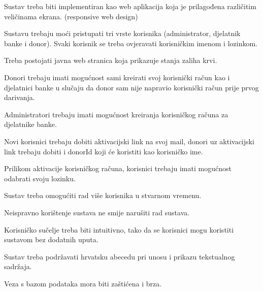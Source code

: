\begin{packed_item}
	
	\item Sustav treba biti implementiran kao web aplikacija koja je prilagođena različitim veličinama ekrana. (responsive web design)
	\item Sustavu trebaju moći pristupati tri vrste korisnika (administrator, djelatnik banke i donor). Svaki korisnik se treba ovjeravati korisničkim imenom i lozinkom.
	\item Treba postojati javna web stranica koja prikazuje stanja zaliha krvi.
	\item Donori trebaju imati mogućnost sami kreirati svoj korisnički račun kao i djelatnici banke u slučaju da donor sam nije napravio korisnički račun prije prvog darivanja.
	\item Administratori trebaju imati mogućnost kreiranja korisničkog računa za djelatnike banke.
	\item Novi korisnici trebaju dobiti aktivacijski link na svoj mail, donori uz aktivacijski link trebaju dobiti i donorId koji će koristiti kao korisničko ime.
	\item Prilikom aktivacije korisničkog računa, korisnici trebaju imati mogućnost odabrati svoju lozinku.
	\item Sustav treba omogućiti rad više korisnika u stvarnom vremenu.
	\item Neispravno korištenje sustava ne smije narušiti rad sustava.
	\item Korisničko sučelje treba biti intuitivno, tako da se korisnici mogu koristiti sustavom bez dodatnih uputa.
	\item Sustav treba podržavati hrvatsku abecedu pri unosu i prikazu tekstualnog sadržaja.
	\item Veza s bazom podataka mora biti zaštićena i brza.

\end{packed_item}





